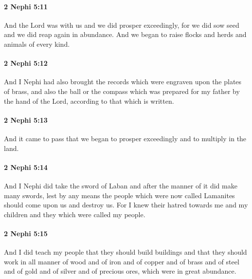 		\paragraph{2 Nephi 5:11} %
			\label{2NEPHI-5-11}

			And the Lord was with us and we did prosper exceedingly,
			for we did sow seed and we did reap again in abundance.
			And we began to raise flocks and herds and animals of every kind.

		\paragraph{2 Nephi 5:12} %
			\label{2NEPHI-5-12}

			And I Nephi had also brought the records
			which were engraven upon the plates of brass,
			and also the ball or the compass
			which was prepared for my father by the hand of the Lord,
			according to that which is written.

		\paragraph{2 Nephi 5:13} %
			\label{2NEPHI-5-13}

			And it came to pass that we began to prosper exceedingly
			and to multiply in the land.

		\paragraph{2 Nephi 5:14} %
			\label{2NEPHI-5-14}

			And I Nephi did take the sword of Laban
			and after the manner of it did make many swords,
			lest by any means the people which were now called Lamanites
			should come upon us and destroy us.
			For I knew their hatred towards me and my children
			and they which were called my people.

		\paragraph{2 Nephi 5:15} %
			\label{2NEPHI-5-15}

			And I did teach my people that they should build buildings
			and that they should work in all manner of wood
			and of iron and of copper and of brass and of steel
			and of gold and of silver and of precious ores,
			which were in great abundance.

